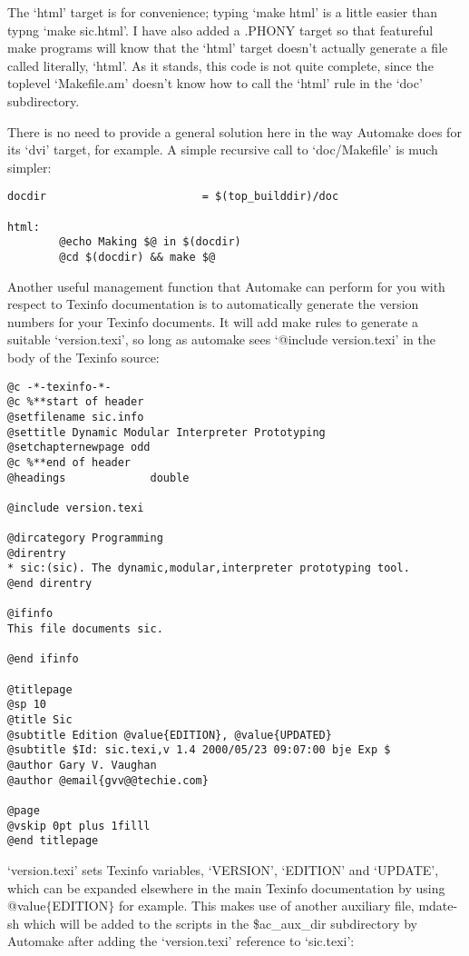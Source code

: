 The `html' target is for convenience; typing `make html' is a little easier than typng `make sic.html'. I have also added a .PHONY target so that featureful make programs will know that the `html' target doesn't actually generate a file called literally, `html'. As it stands, this code is not quite complete, since the toplevel `Makefile.am' doesn't know how to call the `html' rule in the `doc' subdirectory.

There is no need to provide a general solution here in the way Automake does for its `dvi' target, for example. A simple recursive call to `doc/Makefile' is much simpler: 

\begin{Verbatim}[frame=single]
docdir                        = $(top_builddir)/doc

html:
        @echo Making $@ in $(docdir)
        @cd $(docdir) && make $@
\end{Verbatim}

Another useful management function that Automake can perform for you with respect to Texinfo documentation is to automatically generate the version numbers for your Texinfo documents. It will add make rules to generate a suitable `version.texi', so long as automake sees `@include version.texi' in the body of the Texinfo source:

\begin{Verbatim}[frame=single]
   @c -*-texinfo-*-
@c %**start of header
@setfilename sic.info
@settitle Dynamic Modular Interpreter Prototyping
@setchapternewpage odd
@c %**end of header
@headings             double

@include version.texi

@dircategory Programming
@direntry
* sic:(sic). The dynamic,modular,interpreter prototyping tool.
@end direntry

@ifinfo
This file documents sic.

@end ifinfo

@titlepage
@sp 10
@title Sic
@subtitle Edition @value{EDITION}, @value{UPDATED}
@subtitle $Id: sic.texi,v 1.4 2000/05/23 09:07:00 bje Exp $
@author Gary V. Vaughan
@author @email{gvv@@techie.com}

@page
@vskip 0pt plus 1filll
@end titlepage
\end{Verbatim}

`version.texi' sets Texinfo variables, `VERSION', `EDITION' and `UPDATE', which can be expanded elsewhere in the main Texinfo documentation by using 
@value$\{$EDITION$\}$ for example. This makes use of another auxiliary file,
mdate-sh which will be added to the scripts in the \$ac\_{}aux\_{}dir subdirectory by Automake after adding the `version.texi' reference to `sic.texi':

